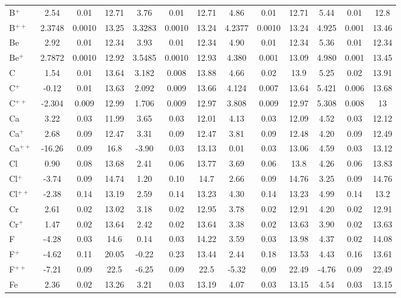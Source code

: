 \begin{longtable}{l!{\vrule width 0.25pt}ccc!{\vrule width 0.25pt}ccc!{\vrule width 0.25pt}ccc!{\vrule width 0.25pt}ccc}
B$^+$ & 2.54 & 0.01 & 12.71 & 3.76 & 0.01 & 12.71 & 4.86 & 0.01 & 12.71 & 5.44 & 0.01 & 12.8 \\
B$^{++}$ & 2.3748 & 0.0010 & 13.25 & 3.3283 & 0.0010 & 13.24 & 4.2377 & 0.0010 & 13.24 & 4.925 & 0.001 & 13.46 \\
Be & 2.92 & 0.01 & 12.34 & 3.93 & 0.01 & 12.34 & 4.90 & 0.01 & 12.34 & 5.36 & 0.01 & 12.34 \\
Be$^+$ & 2.7872 & 0.0010 & 12.92 & 3.5485 & 0.0010 & 12.93 & 4.380 & 0.001 & 13.09 & 4.980 & 0.001 & 13.45 \\
C & 1.54 & 0.01 & 13.64 & 3.182 & 0.008 & 13.88 & 4.66 & 0.02 & 13.9 & 5.25 & 0.02 & 13.91 \\
C$^+$ & -0.12 & 0.01 & 13.63 & 2.092 & 0.009 & 13.66 & 4.124 & 0.007 & 13.64 & 5.421 & 0.006 & 13.68 \\
C$^{++}$ & -2.304 & 0.009 & 12.99 & 1.706 & 0.009 & 12.97 & 3.808 & 0.009 & 12.97 & 5.308 & 0.008 & 13 \\
Ca & 3.22 & 0.03 & 11.99 & 3.65 & 0.03 & 12.01 & 4.13 & 0.03 & 12.09 & 4.52 & 0.03 & 12.12 \\
Ca$^+$ & 2.68 & 0.09 & 12.47 & 3.31 & 0.09 & 12.47 & 3.81 & 0.09 & 12.48 & 4.20 & 0.09 & 12.49 \\
Ca$^{++}$ & -16.26 & 0.09 & 16.8 & -3.90 & 0.03 & 13.13 & 0.01 & 0.03 & 13.06 & 4.59 & 0.03 & 13.12 \\
Cl & 0.90 & 0.08 & 13.68 & 2.41 & 0.06 & 13.77 & 3.69 & 0.06 & 13.8 & 4.26 & 0.06 & 13.83 \\
Cl$^+$ & -3.74 & 0.09 & 14.74 & 1.20 & 0.10 & 14.7 & 2.66 & 0.09 & 14.76 & 3.25 & 0.09 & 14.76 \\
Cl$^{++}$ & -2.38 & 0.14 & 13.19 & 2.59 & 0.14 & 13.23 & 4.30 & 0.14 & 13.23 & 4.99 & 0.14 & 13.2 \\
Cr & 2.61 & 0.02 & 13.02 & 3.18 & 0.02 & 12.95 & 3.78 & 0.02 & 12.91 & 4.20 & 0.02 & 12.91 \\
Cr$^+$ & 1.47 & 0.02 & 13.64 & 2.42 & 0.02 & 13.64 & 3.38 & 0.02 & 13.63 & 3.90 & 0.02 & 13.63 \\
F & -4.28 & 0.03 & 14.6 & 0.14 & 0.03 & 14.22 & 3.59 & 0.03 & 13.98 & 4.37 & 0.02 & 14.08 \\
F$^+$ & -4.62 & 0.11 & 20.05 & -0.22 & 0.23 & 13.44 & 2.44 & 0.18 & 13.53 & 4.43 & 0.16 & 13.61 \\
F$^{++}$ & -7.21 & 0.09 & 22.5 & -6.25 & 0.09 & 22.5 & -5.32 & 0.09 & 22.49 & -4.76 & 0.09 & 22.49 \\
Fe & 2.36 & 0.02 & 13.26 & 3.21 & 0.03 & 13.19 & 4.07 & 0.03 & 13.15 & 4.54 & 0.03 & 13.15 \\

\end{longtable}
